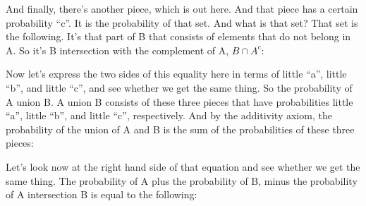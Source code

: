 \documentclass[pdftex, brazil, 12pt, twoside]{article}
\begin{document}
And finally, there's another piece, which is out here.
And that piece has a certain probability ``c''.
It is the probability of that set.
And what is that set?
That set is the following.
It's that part of B that consists of elements that do
not belong in A. So it's B intersection with the
complement of A, $B \cap A^c$:

\begin{figure}[H]
  \begin{center}
  \end{center}
\end{figure}

Now let's express the two sides of this equality here in
terms of little ``a'', little ``b'', and little ``c'', and see whether
we get the same thing.
So the probability of A union B. A union B consists of these
three pieces that have probabilities little ``a'', little
``b'', and little ``c'', respectively.
And by the additivity axiom, the probability of the union
of A and B is the sum of the probabilities
of these three pieces:

\begin{figure}[H]
  \begin{center}
  \end{center}
\end{figure}

Let's look now at the right hand side of that equation and
see whether we get the same thing.
The probability of A plus the probability of B, minus the
probability of A intersection B is equal to the following:

\begin{figure}[H]
  \begin{center}
  \end{center}
\end{figure}
\end{document}
